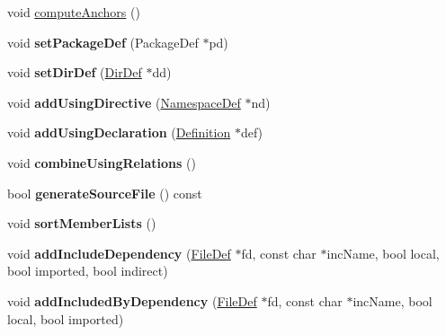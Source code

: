 \begin{DoxyCompactItemize}
\item 
void \mbox{\hyperlink{class_file_def_a8ab814579e542ea5325a6d5d386c56a2}{compute\+Anchors}} ()
\item 
\mbox{\label{class_file_def_a45289f4084172bcc378d6cce05f69fb3}} 
void {\bfseries set\+Package\+Def} (Package\+Def $\ast$pd)
\item 
\mbox{\label{class_file_def_af52c3153426bb05231bc7df5e4b5e498}} 
void {\bfseries set\+Dir\+Def} (\mbox{\hyperlink{class_dir_def}{Dir\+Def}} $\ast$dd)
\item 
\mbox{\label{class_file_def_af23fb1fdd4ed42a2ea4334dea83307d2}} 
void {\bfseries add\+Using\+Directive} (\mbox{\hyperlink{class_namespace_def}{Namespace\+Def}} $\ast$nd)
\item 
\mbox{\label{class_file_def_afcb259a4f68f6840806d8b7e5176f593}} 
void {\bfseries add\+Using\+Declaration} (\mbox{\hyperlink{class_definition}{Definition}} $\ast$def)
\item 
\mbox{\label{class_file_def_ac57b260b28e22bdf186dc3e57f121891}} 
void {\bfseries combine\+Using\+Relations} ()
\item 
\mbox{\label{class_file_def_a83aedcb2d0be96a765c12f0d5c2ddd81}} 
bool {\bfseries generate\+Source\+File} () const
\item 
\mbox{\label{class_file_def_a31bdeeeb4ffdaeac2636c7c5027a8d6b}} 
void {\bfseries sort\+Member\+Lists} ()
\item 
\mbox{\label{class_file_def_a409353a6de84bb6fccfefb9897b6f746}} 
void {\bfseries add\+Include\+Dependency} (\mbox{\hyperlink{class_file_def}{File\+Def}} $\ast$fd, const char $\ast$inc\+Name, bool local, bool imported, bool indirect)
\item 
\mbox{\label{class_file_def_af844c9c34c6f823c3ef1a63896eca26b}} 
void {\bfseries add\+Included\+By\+Dependency} (\mbox{\hyperlink{class_file_def}{File\+Def}} $\ast$fd, const char $\ast$inc\+Name, bool local, bool imported)
\item 
\mbox{\label{class_file_def_a2b9aea5dff41f072486193527fd1a500}} 

\end{DoxyCompactItemize}
